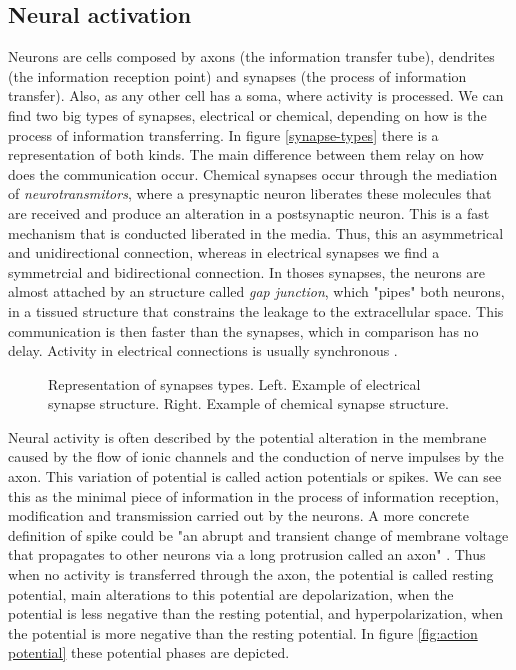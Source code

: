 \subsection{Neural activation}
Neurons are cells composed by axons (the information transfer tube), dendrites (the information reception point) and synapses (the process of information transfer). Also, as any other cell has a soma, where activity is processed. %
We can find two big types of synapses, electrical or chemical, depending on how is the process of information transferring. In figure \ref{synapse-types} there is a representation of both kinds. The main difference between them relay on how does the communication occur. Chemical synapses occur through the mediation of \textit{neurotransmitors}, where a presynaptic neuron liberates these molecules that are received and produce an alteration in a postsynaptic neuron. This is a fast mechanism that is conducted liberated in the media. Thus, this an asymmetrical and unidirectional connection, whereas in electrical synapses we find a symmetrcial and bidirectional connection. In thoses synapses, the neurons are almost attached by an structure called \textit{gap junction}, which "pipes" both neurons, in a tissued structure that constrains the leakage to the extracellular space. This communication is then faster than the synapses, which in comparison has no delay. Activity in electrical connections is usually synchronous \parencite{levitan_neuron_2002}.

\begin{figure}[hbt!]
    \centering
    \caption{Representation of synapses types. Left. Example of electrical synapse structure. Right. Example of chemical synapse structure.}
    \label{fig:synapse-types}
\end{figure}

Neural activity is often described by the potential alteration in the membrane caused by the flow of ionic channels and the conduction of nerve impulses by the axon. This variation of potential is called action potentials or spikes. We can see this as the minimal piece of information in the process of information reception, modification and transmission carried out by the neurons. A more concrete definition of spike could be "an abrupt and transient change of membrane voltage that propagates to other neurons via a long protrusion called an axon" \parencite{izhikevich_dynamical_2007}. Thus when no activity is transferred through the axon, the potential is called resting potential, main alterations to this potential are depolarization, when the potential is less negative than the resting potential, and hyperpolarization, when the potential is more negative than the resting potential. In figure \ref{fig:action potential} these potential phases are depicted. 

